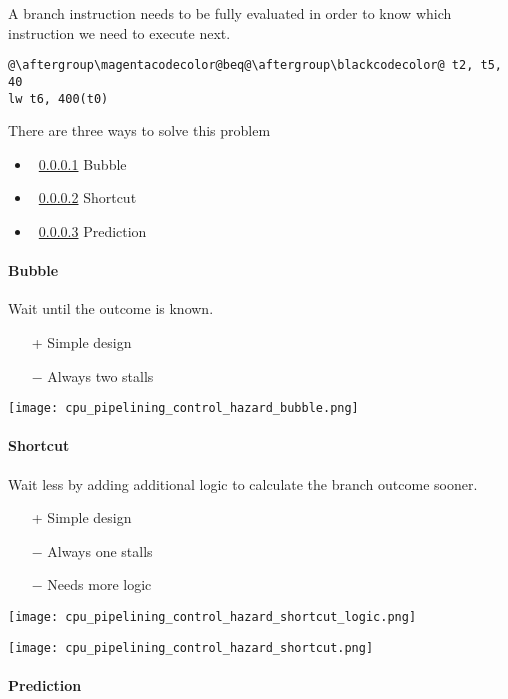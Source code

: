 \begin{multicols*}{3}
    A branch instruction needs to be fully evaluated in order to know which instruction we need to execute next.

    \begin{lstlisting}[escapechar=@]
@\aftergroup\magentacodecolor@beq@\aftergroup\blackcodecolor@ t2, t5, 40
lw t6, 400(t0)
\end{lstlisting}

    There are three ways to solve this problem
    \begin{itemize}
        \item~\ref{bubble} Bubble
        \item~\ref{shortcut} Shortcut
        \item~\ref{prediction} Prediction
    \end{itemize}

    \paragraph{Bubble}\label{bubble}

    Wait until the outcome is known.
    \begin{itemize}
        \item[+] Simple design
        \item[$-$] Always two stalls
    \end{itemize}

    \texttt{[image: cpu\_pipelining\_control\_hazard\_bubble.png]}

    \paragraph{Shortcut}\label{shortcut}

    Wait less by adding additional logic to calculate the branch outcome sooner.

    \begin{itemize}
        \item[+] Simple design
        \item[$-$] Always one stalls
        \item[$-$] Needs more logic
    \end{itemize}

    \texttt{[image: cpu\_pipelining\_control\_hazard\_shortcut\_logic.png]}

    \texttt{[image: cpu\_pipelining\_control\_hazard\_shortcut.png]}

    \paragraph{Prediction}\label{prediction}


\end{multicols*}

